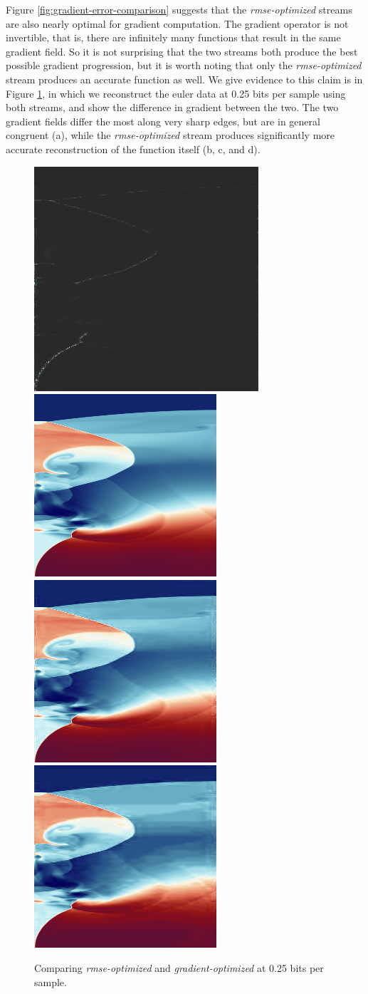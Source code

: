 Figure \ref{fig:gradient-error-comparison} suggests that the \emph{rmse-optimized} streams are also
nearly optimal for gradient computation. The gradient operator is not invertible, that is, there are
infinitely many functions that result in the same gradient field. So it is not surprising that the
two streams both produce the best possible gradient progression, but it is worth noting that only
the \emph{rmse-optimized} stream produces an accurate function as well. We give evidence to this
claim is in Figure \ref{fig:gradient-comparison}, in which we reconstruct the euler data at 0.25
bits per sample using both streams, and show the difference in gradient between the two. The two
gradient fields differ the most along very sharp edges, but are in general congruent (a), while
the \emph{rmse-optimized} stream produces significantly more accurate reconstruction of the function
itself (b, c, and d).

\begin{figure}
	\centering
	{\includegraphics[width=0.24\linewidth]{img/gradient-laplacian/grad-diff.png}}
	{\includegraphics[width=0.24\linewidth]{img/gradient-laplacian/euler-original.png}}
	{\includegraphics[width=0.24\linewidth]{img/gradient-laplacian/euler-rmse.png}}
	{\includegraphics[width=0.24\linewidth]{img/gradient-laplacian/euler-gradient.png}}
	\caption{Comparing \emph{rmse-optimized} and \emph{gradient-optimized} at 0.25 bits per sample. }
	\label{fig:gradient-comparison}
\end{figure}

